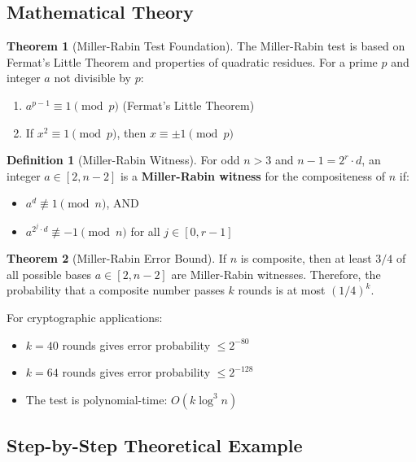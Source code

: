 \documentclass[12pt,a4paper]{article}
\theoremstyle{definition}
\newtheorem{definition}{Definition}[section]
\newtheorem{theorem}{Theorem}[section]
\begin{document}
\subsection{Mathematical Theory}

\begin{theorem}[Miller-Rabin Test Foundation]
The Miller-Rabin test is based on Fermat's Little Theorem and properties of quadratic residues. For a prime $p$ and integer $a$ not divisible by $p$:
\begin{enumerate}
    \item $a^{p-1} \equiv 1 \pmod{p}$ (Fermat's Little Theorem)
    \item If $x^2 \equiv 1 \pmod{p}$, then $x \equiv \pm 1 \pmod{p}$
\end{enumerate}
\end{theorem}

\begin{definition}[Miller-Rabin Witness]
For odd $n > 3$ and $n-1 = 2^r \cdot d$, an integer $a \in [2, n-2]$ is a \textbf{Miller-Rabin witness} for the compositeness of $n$ if:
\begin{itemize}
    \item $a^d \not\equiv 1 \pmod{n}$, AND
    \item $a^{2^j \cdot d} \not\equiv -1 \pmod{n}$ for all $j \in [0, r-1]$
\end{itemize}
\end{definition}

\begin{theorem}[Miller-Rabin Error Bound]
If $n$ is composite, then at least $3/4$ of all possible bases $a \in [2, n-2]$ are Miller-Rabin witnesses. Therefore, the probability that a composite number passes $k$ rounds is at most $(1/4)^k$.
\end{theorem}

For cryptographic applications:
\begin{itemize}
    \item $k = 40$ rounds gives error probability $\leq 2^{-80}$
    \item $k = 64$ rounds gives error probability $\leq 2^{-128}$
    \item The test is polynomial-time: $O(k \log^3 n)$
\end{itemize}

\subsection{Step-by-Step Theoretical Example}
\end{document}
